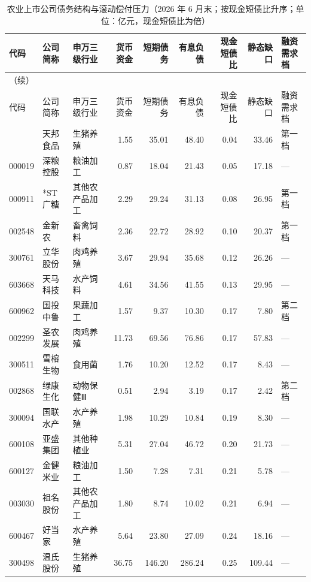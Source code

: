 \begingroup\scriptsize\setlength{\tabcolsep}{1.5pt}
\begin{longtable}{@{}llp{1.9cm}rrrrrl@{}}
\caption{农业上市公司债务结构与滚动偿付压力（2026 年 6 月末；按现金短债比升序；单位：亿元，现金短债比为倍）}\label{tab:company-financing}\\
\toprule
代码 & 公司简称 & 申万三级行业 & 货币资金 & 短期债务 & 有息负债 & 现金短债比 & 静态缺口 & 融资需求档 \\
\midrule
\endfirsthead
\multicolumn{9}{l}{\small（续）}\\
\toprule
代码 & 公司简称 & 申万三级行业 & 货币资金 & 短期债务 & 有息负债 & 现金短债比 & 静态缺口 & 融资需求档 \\
\midrule
\endhead
\bottomrule
\endlastfoot
002124 & 天邦食品 & 生猪养殖 & 1.55 & 35.01 & 48.40 & 0.04 & 33.46 & 第一档 \\
000019 & 深粮控股 & 粮油加工 & 0.87 & 18.04 & 21.43 & 0.05 & 17.18 & --- \\
000911 & *ST广糖 & 其他农产品加工 & 2.29 & 29.24 & 31.13 & 0.08 & 26.95 & 第一档 \\
002548 & 金新农 & 畜禽饲料 & 2.36 & 22.72 & 28.92 & 0.10 & 20.37 & 第一档 \\
300761 & 立华股份 & 肉鸡养殖 & 3.67 & 29.94 & 35.68 & 0.12 & 26.26 & --- \\
603668 & 天马科技 & 水产饲料 & 4.61 & 34.56 & 41.55 & 0.13 & 29.95 & --- \\
600962 & 国投中鲁 & 果蔬加工 & 1.57 & 9.37 & 10.30 & 0.17 & 7.80 & 第二档 \\
002299 & 圣农发展 & 肉鸡养殖 & 11.73 & 69.56 & 76.86 & 0.17 & 57.83 & --- \\
300511 & 雪榕生物 & 食用菌 & 1.76 & 10.20 & 12.52 & 0.17 & 8.43 & --- \\
002868 & 绿康生化 & 动物保健Ⅲ & 0.51 & 2.94 & 3.19 & 0.17 & 2.42 & 第二档 \\
300094 & 国联水产 & 水产养殖 & 1.98 & 10.29 & 10.84 & 0.19 & 8.30 & --- \\
600108 & 亚盛集团 & 其他种植业 & 5.31 & 27.04 & 46.72 & 0.20 & 21.73 & --- \\
600127 & 金健米业 & 粮油加工 & 1.50 & 7.28 & 7.31 & 0.21 & 5.78 & --- \\
003030 & 祖名股份 & 其他农产品加工 & 1.80 & 8.74 & 10.02 & 0.21 & 6.94 & --- \\
600467 & 好当家 & 水产养殖 & 5.64 & 23.80 & 27.09 & 0.24 & 18.16 & --- \\
300498 & 温氏股份 & 生猪养殖 & 36.75 & 146.20 & 286.24 & 0.25 & 109.44 & --- \\

\end{longtable}
